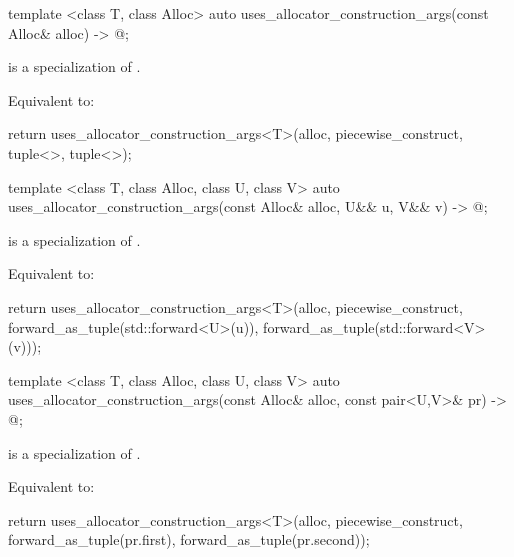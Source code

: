 %
\begin{itemdecl}
template <class T, class Alloc>
  auto uses_allocator_construction_args(const Alloc& alloc) -> @\seebelow@;
\end{itemdecl}

\begin{itemdescr}
\pnum
\constraints
{} is a specialization of .

\pnum
\effects
Equivalent to:
\begin{codeblock}
return uses_allocator_construction_args<T>(alloc, piecewise_construct,
                                           tuple<>{}, tuple<>{});
\end{codeblock}
\end{itemdescr}

%
\begin{itemdecl}
template <class T, class Alloc, class U, class V>
  auto uses_allocator_construction_args(const Alloc& alloc, U&& u, V&& v) -> @\seebelow@;
\end{itemdecl}

\begin{itemdescr}
\pnum
\constraints
{} is a specialization of .

\pnum
\effects
Equivalent to:
\begin{codeblock}
return uses_allocator_construction_args<T>(alloc, piecewise_construct,
                                           forward_as_tuple(std::forward<U>(u)),
                                           forward_as_tuple(std::forward<V>(v)));
\end{codeblock}
\end{itemdescr}

%
\begin{itemdecl}
template <class T, class Alloc, class U, class V>
  auto uses_allocator_construction_args(const Alloc& alloc, const pair<U,V>& pr) -> @\seebelow@;
\end{itemdecl}

\begin{itemdescr}
\pnum
\constraints
{} is a specialization of .

\pnum
\effects
Equivalent to:
\begin{codeblock}
return uses_allocator_construction_args<T>(alloc, piecewise_construct,
                                           forward_as_tuple(pr.first),
                                           forward_as_tuple(pr.second));
\end{codeblock}
\end{itemdescr}

